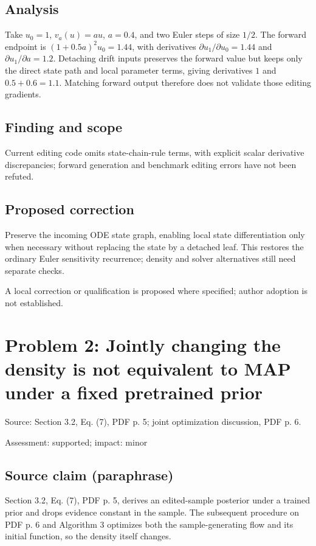 \documentclass[11pt]{article}
\begin{document}
\subsection*{Analysis}

Take \(u_0=1\), \(v_a(u)=au\), \(a=0.4\), and two Euler steps of size \(1/2\). The forward endpoint is \((1+0.5a)^2u_0=1.44\), with derivatives \(\partial u_1/\partial u_0=1.44\) and \(\partial u_1/\partial a=1.2\). Detaching drift inputs preserves the forward value but keeps only the direct state path and local parameter terms, giving derivatives \(1\) and \(0.5+0.6=1.1\). Matching forward output therefore does not validate those editing gradients.

\subsection*{Finding and scope}

Current editing code omits state-chain-rule terms, with explicit scalar derivative discrepancies; forward generation and benchmark editing errors have not been refuted.

\subsection*{Proposed correction}

Preserve the incoming ODE state graph, enabling local state differentiation only when necessary without replacing the state by a detached leaf. This restores the ordinary Euler sensitivity recurrence; density and solver alternatives still need separate checks.

A local correction or qualification is proposed where specified; author adoption is not established.

\section*{Problem 2: Jointly changing the density is not equivalent to MAP under a fixed pretrained prior}

Source: Section 3.2, Eq. (7), PDF p. 5; joint optimization discussion, PDF p. 6.

Assessment: supported; impact: minor

\subsection*{Source claim (paraphrase)}

Section 3.2, Eq. (7), PDF p. 5, derives an edited-sample posterior under a trained prior and drops evidence constant in the sample. The subsequent procedure on PDF p. 6 and Algorithm 3 optimizes both the sample-generating flow and its initial function, so the density itself changes.
\end{document}
